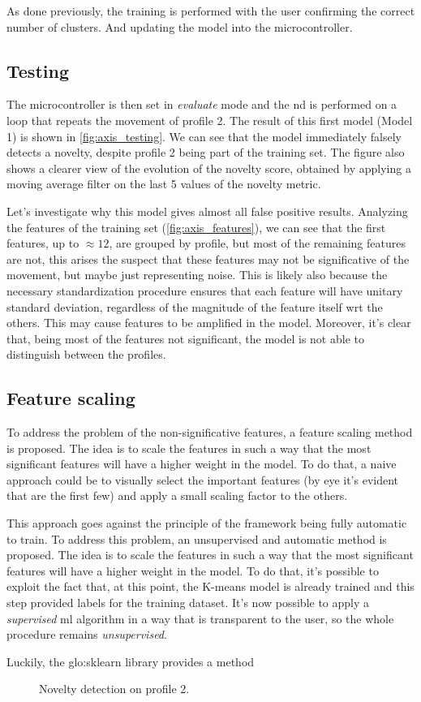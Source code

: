 As done previously, the training is performed with the user confirming the correct number of clusters. And updating the model into the microcontroller.

\subsection{Testing}
The microcontroller is then set in \emph{evaluate} mode and the \gls{nd} is performed on a loop that repeats the movement of profile 2. The result of this first model (Model 1) is shown in \autoref{fig:axis_testing}. We can see that the model immediately falsely detects a novelty, despite profile 2 being part of the training set. The figure also shows a clearer view of the evolution of the novelty score, obtained by applying a moving average filter on the last 5 values of the novelty metric.

Let's investigate why this model gives almost all false positive results. Analyzing the features of the training set (\autoref{fig:axis_features}), we can see that the first features, up to $\approx 12$, are grouped by profile, but most of the remaining features are not, this arises the suspect that these features may not be significative of the movement, but maybe just representing noise. This is likely also because the necessary standardization procedure ensures that each feature will have unitary standard deviation, regardless of the magnitude of the feature itself \gls{wrt} the others. This may cause  features to be amplified in the model. Moreover, it's clear that, being most of the features not significant, the model is not able to distinguish between the profiles.

\subsection{Feature scaling}
To address the problem of the non-significative features, a feature scaling method is proposed. The idea is to scale the features in such a way that the most significant features will have a higher weight in the model. To do that, a naive approach could be to visually select the important features (by eye it's evident that are the first few) and apply a small scaling factor to the others. 

This approach goes against the principle of the framework being fully automatic to train. To address this problem, an unsupervised and automatic method is proposed. The idea is to scale the features in such a way that the most significant features will have a higher weight in the model. To do that, it's possible to exploit the fact that, at this point, the K-means model is already trained and this step provided labels for the training dataset. It's now possible to apply a \emph{supervised} \gls{ml} algorithm in a way that is transparent to the user, so the whole procedure remains \emph{unsupervised}.

Luckily, the \gls{glo:sklearn} library provides a method \todo


\begin{figure}
    \centering
    \caption{Novelty detection on profile 2.}
    \label{fig:axis_testing}
\end{figure}